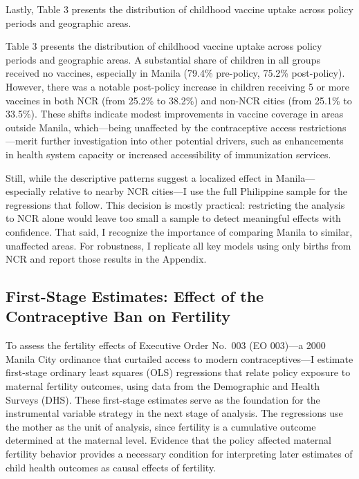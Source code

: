 \documentclass[]{AEA}
\begin{document}
Lastly, Table 3 presents the distribution of childhood vaccine uptake
across policy periods and geographic areas.



Table 3 presents the distribution of childhood vaccine uptake across
policy periods and geographic areas. A substantial share of children in
all groups received no vaccines, especially in Manila (79.4\%
pre-policy, 75.2\% post-policy). However, there was a notable
post-policy increase in children receiving 5 or more vaccines in both
NCR (from 25.2\% to 38.2\%) and non-NCR cities (from 25.1\% to 33.5\%).
These shifts indicate modest improvements in vaccine coverage in areas
outside Manila, which---being unaffected by the contraceptive access
restrictions---merit further investigation into other potential drivers,
such as enhancements in health system capacity or increased
accessibility of immunization services.

Still, while the descriptive patterns suggest a localized effect in
Manila---especially relative to nearby NCR cities---I use the full
Philippine sample for the regressions that follow. This decision is
mostly practical: restricting the analysis to NCR alone would leave too
small a sample to detect meaningful effects with confidence. That said,
I recognize the importance of comparing Manila to similar, unaffected
areas. For robustness, I replicate all key models using only births from
NCR and report those results in the Appendix.

\subsection{First-Stage Estimates: Effect of the Contraceptive Ban on Fertility}

To assess the fertility effects of Executive Order No.~003 (EO 003)---a
2000 Manila City ordinance that curtailed access to modern
contraceptives---I estimate first-stage ordinary least squares (OLS)
regressions that relate policy exposure to maternal fertility outcomes,
using data from the Demographic and Health Surveys (DHS). These
first-stage estimates serve as the foundation for the instrumental
variable strategy in the next stage of analysis. The regressions use the
mother as the unit of analysis, since fertility is a cumulative outcome
determined at the maternal level. Evidence that the policy affected
maternal fertility behavior provides a necessary condition for
interpreting later estimates of child health outcomes as causal effects
of fertility.
\end{document}
